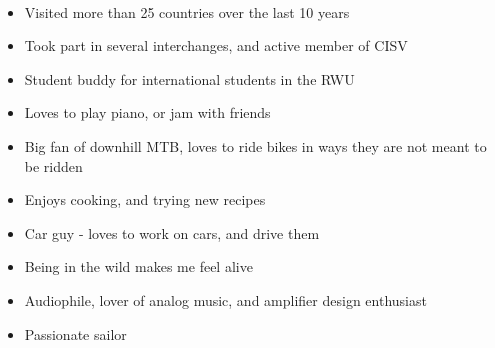 \documentclass[10pt,a4paper,ragged2e,withhyper]{altacv}
\begin{document}
\begin{paracol}{2}

\divider\smallskip


\divider\smallskip

\\

\smallskip


\divider

\divider

\divider


\medskip



\newpage


\begin{itemize}
\item Visited more than 25 countries over the last 10 years
\item Took part in several interchanges, and active member of CISV
\item Student buddy for international students in the RWU
\end{itemize}

\divider

\begin{itemize}
  \item Loves to play piano, or jam with friends
  \item Big fan of downhill MTB, loves to ride bikes in ways they are not meant to be ridden
  \item Enjoys cooking, and trying new recipes  
  \item Car guy - loves to work on cars, and drive them
  \item Being in the wild makes me feel alive
  \item Audiophile, lover of analog music, and amplifier design enthusiast
  \item Passionate sailor
\end{itemize}


\end{paracol}
\end{document}
